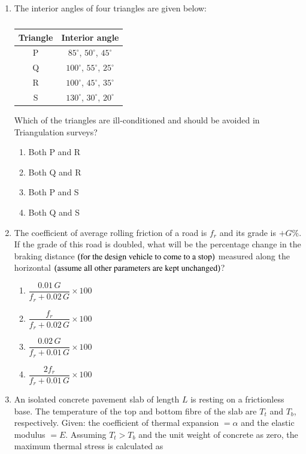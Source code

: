 \documentclass[journal,12pt,onecolumn]{IEEEtran}
\theoremstyle{remark}
\begin{document}
\begin{enumerate}
\item The interior angles of four triangles are given below:

\begin{table}[H]
\centering
\begin{tabular}{|c|c|}
\hline
Triangle & Interior angle\\
\hline
P & $85^\circ$, $50^\circ$, $45^\circ$\\
\hline
Q & $100^\circ$, $55^\circ$, $25^\circ$\\
\hline
R & $100^\circ$, $45^\circ$, $35^\circ$\\
\hline
S & $130^\circ$, $30^\circ$, $20^\circ$\\
\end{tabular}
\caption*{}
\label{tab:Q.10}
\end{table}
Which of the triangles are ill-conditioned and should be avoided in Triangulation surveys?

\hfill{}
\begin{enumerate}
\item Both P and R
\item Both Q and R
\item Both P and S
\item Both Q and S
\end{enumerate}

\item The coefficient of average rolling friction of a road is $f_r$ and its grade is $+G\%$. If the grade of this road is doubled, what will be the percentage change in the braking distance $\left(\text{for the design vehicle to come to a stop}\right)$ measured along the horizontal $\left(\text{assume all other parameters are kept unchanged}\right)$?

\hfill{}
\begin{enumerate}
\item $\dfrac{0.01\,G}{f_r + 0.02\,G} \times 100$
\item $\dfrac{f_r}{f_r + 0.02\,G} \times 100$
\item $\dfrac{0.02\,G}{f_r + 0.01\,G} \times 100$
\item $\dfrac{2f_r}{f_r + 0.01\,G} \times 100$
\end{enumerate}

\item An isolated concrete pavement slab of length $L$ is resting on a frictionless base. The temperature of the top and bottom fibre of the slab are $T_t$ and $T_b$, respectively. Given: the coefficient of thermal expansion $= \alpha$ and the elastic modulus $= E$. Assuming $T_t > T_b$ and the unit weight of concrete as zero, the maximum thermal stress is calculated as


\end{enumerate}
\end{document}
